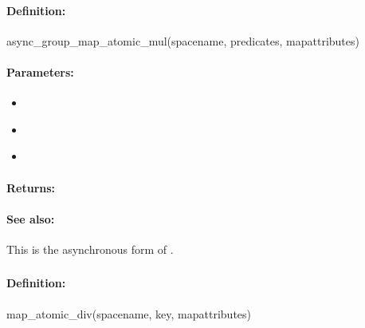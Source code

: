 \paragraph{Definition:}
\begin{rubycode}
async_group_map_atomic_mul(spacename, predicates, mapattributes)
\end{rubycode}

\paragraph{Parameters:}
\begin{itemize}[noitemsep]
\item {}\\

\item {}\\

\item {}\\

\end{itemize}

\paragraph{Returns:}


\paragraph{See also:}  This is the asynchronous form of .

\pagebreak
\subsubsection{}
\label{api:ruby:map_atomic_div}


\paragraph{Definition:}
\begin{rubycode}
map_atomic_div(spacename, key, mapattributes)
\end{rubycode}

